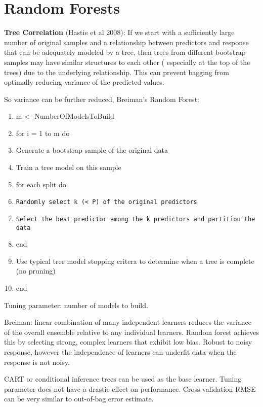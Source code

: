 \documentclass[]{article}
\begin{document}
\section{Random Forests}\label{random-forests}

\textbf{Tree Correlation} (Hastie et al 2008): If we start with a
sufficiently large number of original samples and a relationship between
predictors and response that can be adequately modeled by a tree, then
trees from different bootstrap samples may have similar structures to
each other ( especially at the top of the trees) due to the underlying
relationship. This can prevent bagging from optimally reducing variance
of the predicted values.

So variance can be further reduced, Breiman's Random Forest:

\begin{enumerate}
\def\labelenumi{\arabic{enumi}.}
\item
  m \textless{}- NumberOfModelsToBuild
\item
  for i = 1 to m do
\item
  Generate a bootstrap sample of the original data
\item
  Train a tree model on this sample
\item
  for each split do
\item
\begin{verbatim}
Randomly select k (< P) of the original predictors
\end{verbatim}
\item
\begin{verbatim}
Select the best predictor among the k predictors and partition the data
\end{verbatim}
\item
  end
\item
  Use typical tree model stopping critera to determine when a tree is
  complete (no pruning)
\item
  end
\end{enumerate}

Tuning parameter: number of models to build.

Breiman: linear combination of many independent learners reduces the
variance of the overall ensemble relative to any individual learners.
Random forest achieves this by selecting strong, complex learners that
exhibit low bias. Robust to noisy response, however the independence of
learners can underfit data when the response is not noisy.

CART or conditional inference trees can be used as the base learner.
Tuning parameter does not have a drastic effect on performance.
Cross-validation RMSE can be very similar to out-of-bag error estimate.
\end{document}
